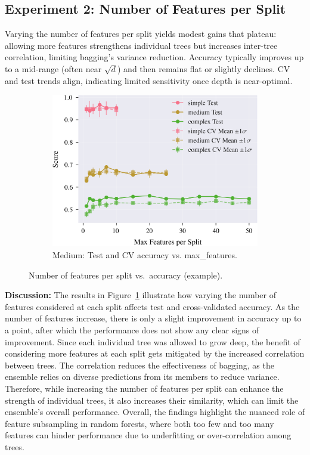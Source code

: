 \documentclass[conference]{IEEEtran}
\begin{document}
\subsection{Experiment 2: Number of Features per Split}
\label{sec:results-exp2}
Varying the number of features per split yields modest gains that plateau: allowing more features strengthens individual trees but increases inter-tree correlation, limiting bagging's variance reduction. Accuracy typically improves up to a mid-range (often near $\sqrt{d}$) and then remains flat or slightly declines. CV and test trends align, indicating limited sensitivity once depth is near-optimal.

\begin{figure}[H]
  \centering
  \begin{subfigure}[b]{\columnwidth}
    \centering
    \includegraphics[width=\linewidth]{images/all_datasets_accuracy_vs_features.png}
    \caption{Medium: Test and CV accuracy vs. max\_features.}
    \label{fig:exp2-medium-acc}
  \end{subfigure}
  \caption{Number of features per split vs.\ accuracy (example).}
  \label{fig:exp2-accuracy-features}
\end{figure}


\textbf{Discussion:}
The results in Figure~\ref{fig:exp2-medium-acc} illustrate how varying the number of features considered at each split affects test and cross-validated accuracy. As the number of features increase, there is only a slight improvement in accuracy up to a point, after which the performance does not show any clear signs of improvement. Since each individual tree was allowed to grow deep, the benefit of considering more features at each split gets mitigated by the increased correlation between trees. The correlation reduces the effectiveness of bagging, as the ensemble relies on diverse predictions from its members to reduce variance. Therefore, while increasing the number of features per split can enhance the strength of individual trees, it also increases their similarity, which can limit the ensemble's overall performance. Overall, the findings highlight the nuanced role of feature subsampling in random forests, where both too few and too many features can hinder performance due to underfitting or over-correlation among trees.
\end{document}
